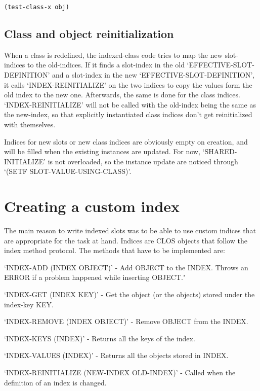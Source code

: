 \begin{Verbatim}[fontsize=\small,frame=leftline,framerule=0.9mm,rulecolor=\color{gray},framesep=5.1mm,xleftmargin=5mm,fontfamily=cmtt]
(test-class-x obj)
\end{Verbatim}


\subsection{ Class and object reinitialization}

When a class is redefined, the indexed-class code tries to map
the new slot-indices to the old-indices. If it finds a slot-index
in the old `EFFECTIVE-SLOT-DEFINITION' and a slot-index in the new
`EFFECTIVE-SLOT-DEFINITION', it calls `INDEX-REINITIALIZE' on the
two indices to copy the values form the old index to the new
one. Afterwards, the same is done for the class
indices. `INDEX-REINITIALIZE' will not be called with the
old-index being the same as the new-index, so that explicitly
instantiated class indices don't get reinitialized with
themselves.

Indices for new slots or new class indices are obviously empty on
creation, and will be filled when the existing instances are
updated. For now, `SHARED-INITIALIZE' is not overloaded, so the
instance update are noticed through `(SETF SLOT-VALUE-USING-CLASS)'.


\section{ Creating a custom index}

The main reason to write indexed slots was to be able to use
custom indices that are appropriate for the task at hand. Indices
are CLOS objects that follow the index method protocol. The
methods that have to be implemented are:

`INDEX-ADD (INDEX OBJECT)' - Add OBJECT to the INDEX. Throws an
ERROR if a problem happened while inserting OBJECT."

`INDEX-GET (INDEX KEY)' - Get the object (or the objects) stored
under the index-key KEY.

`INDEX-REMOVE (INDEX OBJECT)' - Remove OBJECT from the INDEX.

`INDEX-KEYS (INDEX)' - Returns all the keys of the index.

`INDEX-VALUES (INDEX)' - Returns all the objects stored in INDEX.

`INDEX-REINITIALIZE (NEW-INDEX OLD-INDEX)' - Called when the
definition of an index is changed.

